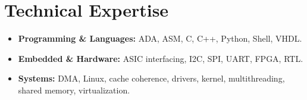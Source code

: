 \documentclass[9pt,a4paper]{article}
\begin{document}
\section*{Technical Expertise}
\begin{tcolorbox}[mybox]
\begin{itemize}
\item \textbf{Programming \& Languages:} ADA, ASM, C, C++, Python, Shell, VHDL.

\item \textbf{Embedded \& Hardware:} ASIC interfacing, I2C, SPI, UART, FPGA, RTL.

\item \textbf{Systems:} DMA, Linux, cache coherence, drivers, kernel, multithreading, shared memory, virtualization.
\end{itemize}
\end{tcolorbox}
\end{document}
